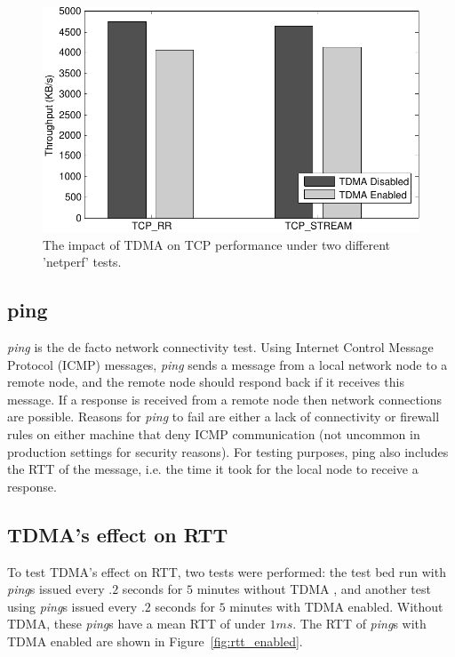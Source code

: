 \documentclass[oneside,12pt]{memoir}
\begin{document}
\begin{figure}
\centering
\includegraphics[scale=0.75]{detailed_performance.pdf}
\caption{The impact of TDMA on TCP performance under two different 'netperf' tests.}
\label{fig:detailed_performance}
\end{figure}

\subsection{ping}
\textit{ping} is the de facto network connectivity test. Using Internet Control Message Protocol (ICMP) messages, \textit{ping} sends a message from a local network node to a remote node, and the remote node should respond back if it receives this message. If a response is received from a remote node then network connections are possible. Reasons for \textit{ping} to fail are either a lack of connectivity or firewall rules on either machine that deny ICMP communication (not uncommon in production settings for security reasons). For testing purposes, ping also includes the RTT of the message, i.e. the time it took for the local node to receive a response. 

\subsection{TDMA's effect on RTT}
To test TDMA's effect on RTT, two tests were performed: the test bed run with \textit{ping}s issued every $.2$ seconds for $5$ minutes without TDMA , and another test using \textit{ping}s issued every $.2$ seconds for $5$ minutes with TDMA enabled. Without TDMA, these \textit{ping}s have a mean RTT of under $1ms$. The RTT of \textit{ping}s with TDMA enabled are shown in Figure~\ref{fig:rtt_enabled}.
\end{document}
